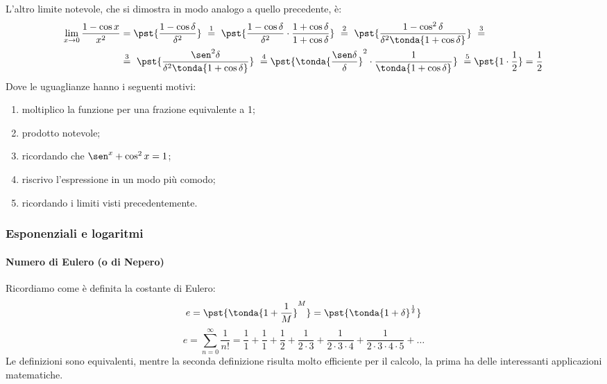 L'altro limite notevole, che si dimostra in modo analogo a quello 
precedente, è:
\begin{align*}
 \lim_{x \rightarrow 0} \frac{1-\cos x}{x^2} &=
 \pst{\frac{1-\cos \delta}{\delta^2}}
~ \stackrel{1}{=} ~  
 \pst{\frac{1-\cos \delta}{\delta^2} \cdot 
      \frac{1+\cos \delta}{1+\cos \delta}}
~ \stackrel{2}{=} ~ 
 \pst{\frac{1-\cos^2 \delta}{\delta^2 \tonda{1+\cos \delta}}}~ 
\stackrel{3}{=} \\
& \stackrel{3}{=} ~
 \pst{\frac{\sen^2 \delta}{\delta^2 \tonda{1+\cos \delta}}}
~ \stackrel{4}{=}
 \pst{\tonda{\frac{\sen \delta}{\delta}}^2 \cdot 
      \frac{1}{\tonda{1+\cos \delta}}}
~ \stackrel{5}{=}
 \pst{1 \cdot \frac{1}{2}} = \frac{1}{2}
\end{align*}
Dove le uguaglianze hanno i seguenti motivi:
\begin{enumerate} [nosep]
 \item moltiplico la funzione per una frazione equivalente a 1;
 \item prodotto notevole;
 \item ricordando che \(\sen^x + \cos^2 x = 1\);
 \item riscrivo l'espressione in un modo più comodo;
 \item ricordando i limiti visti precedentemente.
\end{enumerate}

\subsubsection{Esponenziali e logaritmi}

\paragraph{Numero di Eulero (o di Nepero)}

Ricordiamo come è definita la costante di Eulero:
\[e = \pst{\tonda{1+\frac{1}{M}}^M} = 
\pst{\tonda{1+\delta}^\frac{1}{\delta}} 
\]
\[e=\sum_{n=0}^{\infty}{\frac{1}{n!}}=
\frac{1}{1}+\frac{1}{1}+\frac{1}{2}+\frac{1}{2\cdot3}+
\frac{1}{2\cdot3\cdot4}+\frac{1}{2\cdot3\cdot4\cdot5}+\dots\]
Le definizioni sono equivalenti, mentre la seconda definizione risulta 
molto efficiente per il calcolo, la 
prima ha delle interessanti applicazioni matematiche.


